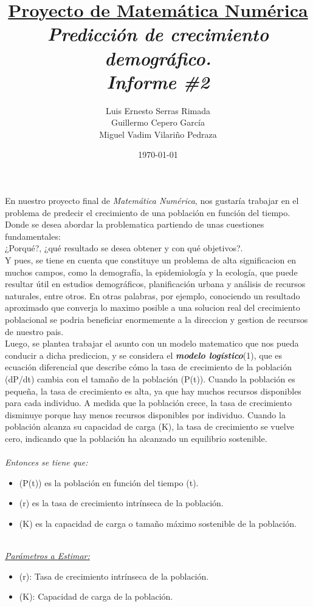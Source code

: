 \documentclass{article}
\title{\textbf{\underline{Proyecto de Matemática Numérica}} \\ \textit{Predicción de crecimiento demográfico.} \\ \textit{Informe \#2}}
\author{Luis Ernesto Serras Rimada \\ Guillermo Cepero García \\ Miguel Vadim Vilariño Pedraza}
\date{\today}
\begin{document}
\maketitle
En nuestro proyecto final de \textit{Matemática Numérica}, nos gustaría trabajar en el problema de predecir el crecimiento
de una población en función del tiempo. Donde se desea abordar la problematica partiendo de unas cuestiones fundamentales:\\
¿Porqué?, ¿qué resultado se desea obtener y con qué objetivos?.\\
Y pues, se tiene en cuenta que constituye un problema de alta significacion en muchos campos, como la demografía, la
epidemiología y la ecología, que puede resultar útil en estudios demográficos, planificación urbana y análisis de recursos
naturales, entre otros. En otras palabras, por ejemplo, conociendo un resultado aproximado que converja lo maximo posible a una solucion real 
del crecimiento poblacional se podria beneficiar enormemente a la direccion y gestion de recursos de nuestro pais.\\
Luego, se plantea trabajar el asunto con un modelo matematico que nos pueda conducir a dicha prediccion, y se considera 
el \textit{\textbf{modelo logístico}}(1), que es ecuación diferencial que describe cómo la tasa de crecimiento de la población (dP/dt) 
cambia con el tamaño de la población (P(t)). Cuando la población es pequeña, la tasa de crecimiento es alta, ya que 
hay muchos recursos disponibles para cada individuo. A medida que la población crece, la tasa de crecimiento disminuye 
porque hay menos recursos disponibles por individuo. Cuando la población alcanza su capacidad de carga (K), la tasa 
de crecimiento se vuelve cero, indicando que la población ha alcanzado un equilibrio sostenible.\\
\\
\textit{Entonces se tiene que:}
\begin{itemize}
    \item (P(t)) es la población en función del tiempo (t).
    \item (r) es la tasa de crecimiento intrínseca de la población.
    \item (K) es la capacidad de carga o tamaño máximo sostenible de la población.
\end{itemize}\\
\textit{\underline{Parámetros a Estimar:}}
\begin{itemize}
    \item (r): Tasa de crecimiento intrínseca de la población. 
    \item (K): Capacidad de carga de la población.
\end{itemize}\\
\end{document}
